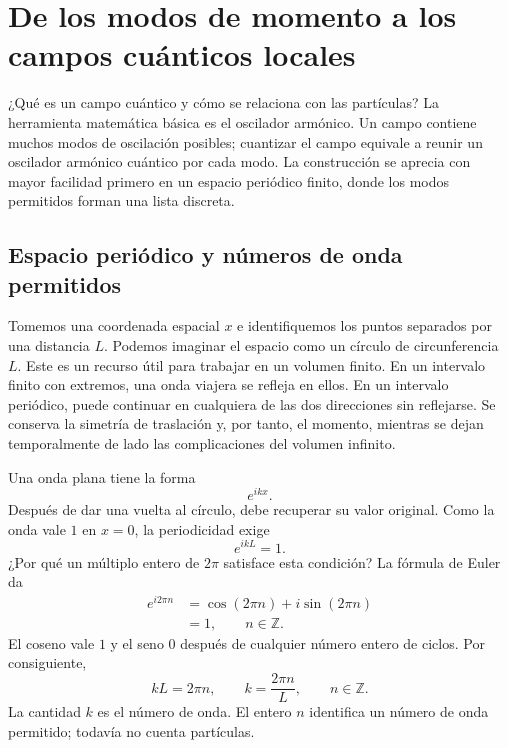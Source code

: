 \chapter{De los modos de momento a los campos cuánticos locales}

¿Qué es un campo cuántico y cómo se relaciona con las partículas? La herramienta matemática básica es el oscilador armónico. Un campo contiene muchos modos de oscilación posibles; cuantizar el campo equivale a reunir un oscilador armónico cuántico por cada modo. La construcción se aprecia con mayor facilidad primero en un espacio periódico finito, donde los modos permitidos forman una lista discreta.

\section{Espacio periódico y números de onda permitidos}

Tomemos una coordenada espacial \(x\) e identifiquemos los puntos separados por una distancia \(L\). Podemos imaginar el espacio como un círculo de circunferencia \(L\). Este es un recurso útil para trabajar en un volumen finito. En un intervalo finito con extremos, una onda viajera se refleja en ellos. En un intervalo periódico, puede continuar en cualquiera de las dos direcciones sin reflejarse. Se conserva la simetría de traslación y, por tanto, el momento, mientras se dejan temporalmente de lado las complicaciones del volumen infinito.

Una onda plana tiene la forma
\begin{equation}
e^{ikx}.
\end{equation}
Después de dar una vuelta al círculo, debe recuperar su valor original. Como la onda vale \(1\) en \(x=0\), la periodicidad exige
\begin{equation}
e^{ikL}=1.
\end{equation}
¿Por qué un múltiplo entero de \(2\pi\) satisface esta condición? La fórmula de Euler da
\begin{align}
e^{i2\pi n}
&=\cos(2\pi n)+i\sin(2\pi n)\\
&=1,
\qquad n\in\mathbb Z.
\end{align}
El coseno vale \(1\) y el seno \(0\) después de cualquier número entero de ciclos. Por consiguiente,
\begin{equation}
kL=2\pi n,
\qquad
k=\frac{2\pi n}{L},
\qquad n\in\mathbb Z.
\end{equation}
La cantidad \(k\) es el número de onda. El entero \(n\) identifica un número de onda permitido; todavía no cuenta partículas.

